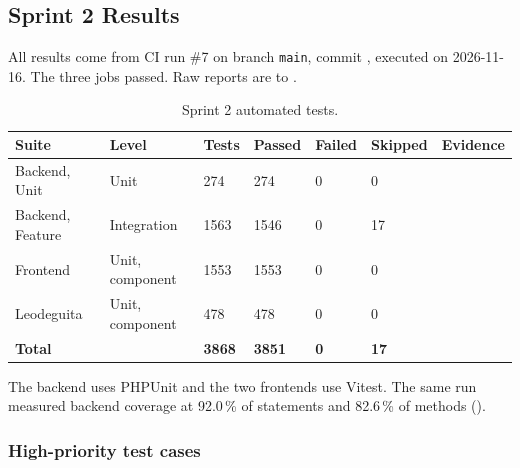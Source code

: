 \subsection{Sprint 2 Results}
\label{sec:results-sprint2}

All results come from CI run \#7 on branch \texttt{main}, commit , executed on 2026-11-16.
The three jobs passed.
Raw reports are  to .

\begin{table}[H]
  \centering
  \begin{tabularx}{\linewidth}{L{3cm}L{2.6cm}L{1.4cm}L{1.4cm}L{1.3cm}L{1.4cm}Y}
    \toprule
    Suite & Level & Tests & Passed & Failed & Skipped & Evidence \\
    \midrule
    Backend, Unit & Unit & 274 & 274 & 0 & 0 &  \\
    Backend, Feature & Integration & 1563 & 1546 & 0 & 17 &  \\
    Frontend & Unit, component & 1553 & 1553 & 0 & 0 &  \\
    Leodeguita & Unit, component & 478 & 478 & 0 & 0 &  \\
    \midrule
    \textbf{Total} & & \textbf{3868} & \textbf{3851} & \textbf{0} & \textbf{17} & \\
    \bottomrule
  \end{tabularx}
  \caption{Sprint 2 automated tests.}
  \label{tab:results-sprint2-automated}
\end{table}

The backend uses PHPUnit and the two frontends use Vitest.
The same run measured backend coverage at 92.0\,\% of statements and 82.6\,\% of methods ().


\subsubsection*{High-priority test cases}

